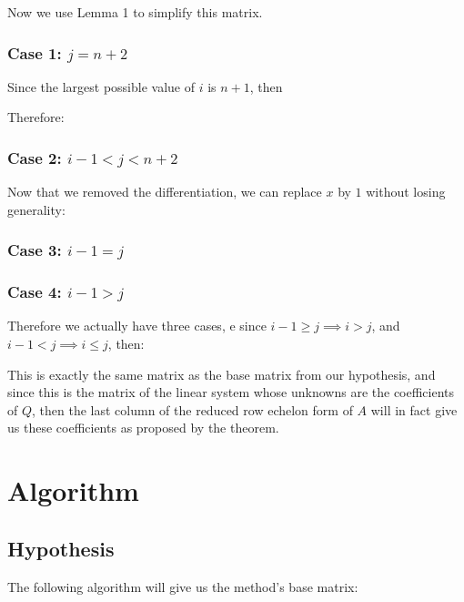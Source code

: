 \documentclass[a4paper, 10pt]{article}
\begin{document}
Now we use Lemma 1 to simplify this matrix.

\pagebreak
\subsubsection{Case 1: $j = n + 2$}

Since the largest possible value of $i$ is $n+1$, then

\caseOneComparison

Therefore:

\caseOneResult

\subsubsection{Case 2: $i - 1 < j < n + 2$}

\caseTwoPartOne

Now that we removed the differentiation, we can replace $x$ by $1$ without losing generality:

\caseTwoPartTwo

\subsubsection{Case 3: $i - 1 = j$}

\caseThree

\subsubsection{Case 4: $i - 1 > j$}

\caseFour

Therefore we actually have three cases, e since $i - 1 \geq j \implies i > j$, and $i - 1 < j \implies i \leq j$, then:

\aijDef

This is exactly the same matrix as the base matrix from our hypothesis, and since this is the matrix of the linear system whose unknowns are the coefficients of $Q$, then the last column of the reduced row echelon form of $A$ will in fact give us these coefficients as proposed by the theorem.

\pagebreak
\section{Algorithm}

\subsection{Hypothesis}
The following algorithm will give us the method's base matrix:\\
\algorithm
\end{document}
